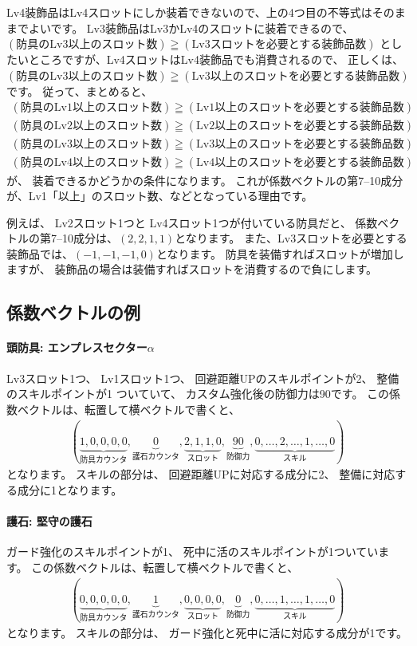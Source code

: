 \documentclass{jsarticle}
\begin{document}
Lv4装飾品はLv4スロットにしか装着できないので、上の4つ目の不等式はそのままでよいです。
Lv3装飾品はLv3かLv4のスロットに装着できるので、
$(\text{防具のLv3以上のスロット数}) \geqq (\text{Lv3スロットを必要とする装飾品数})$
としたいところですが、Lv4スロットはLv4装飾品でも消費されるので、
正しくは、
$(\text{防具のLv3以上のスロット数}) \geqq (\text{Lv3以上のスロットを必要とする装飾品数})$
です。
従って、まとめると、
\begin{align*}
(\text{防具のLv1以上のスロット数}) \geqq (\text{Lv1以上のスロットを必要とする装飾品数}) \\
(\text{防具のLv2以上のスロット数}) \geqq (\text{Lv2以上のスロットを必要とする装飾品数}) \\
(\text{防具のLv3以上のスロット数}) \geqq (\text{Lv3以上のスロットを必要とする装飾品数}) \\
(\text{防具のLv4以上のスロット数}) \geqq (\text{Lv4以上のスロットを必要とする装飾品数}) 
\end{align*}
が、
装着できるかどうかの条件になります。
%
これが係数ベクトルの第7--10成分が、Lv1「以上」のスロット数、などとなっている理由です。

例えば、
Lv2スロット1つと
Lv4スロット1つが付いている防具だと、
係数ベクトルの第7--10成分は、$(2,2,1,1)$となります。
%
また、Lv3スロットを必要とする装飾品では、$(-1,-1,-1,0)$となります。
防具を装備すればスロットが増加しますが、
装飾品の場合は装備すればスロットを消費するので負にします。

\subsection{係数ベクトルの例}
\paragraph{頭防具: エンプレスセクター$\alpha$}
Lv3スロット1つ、
Lv1スロット1つ、
回避距離UPのスキルポイントが2、
整備のスキルポイントが1
ついていて、
カスタム強化後の防御力は90です。
%
この係数ベクトルは、転置して横ベクトルで書くと、
\begin{align*}
(
\underbrace{1,0,0,0,0}_{\text{防具カウンタ}},
\underbrace{0}_{\text{護石カウンタ}},
\underbrace{2,1,1,0}_{\text{スロット}},
\underbrace{90}_{\text{防御力}},
\underbrace{0,\ldots, 2, \ldots, 1, \ldots ,0}_{\text{スキル}}
)
\end{align*}
となります。
スキルの部分は、
回避距離UPに対応する成分に2、
整備に対応する成分に1となります。

\paragraph{護石: 堅守の護石}
ガード強化のスキルポイントが1、
死中に活のスキルポイントが1ついています。
%
この係数ベクトルは、転置して横ベクトルで書くと、
\begin{align*}
(
\underbrace{0,0,0,0,0}_{\text{防具カウンタ}},
\underbrace{1}_{\text{護石カウンタ}},
\underbrace{0,0,0,0}_{\text{スロット}},
\underbrace{0}_{\text{防御力}},
\underbrace{0,\ldots, 1, \ldots, 1, \ldots ,0}_{\text{スキル}}
)
\end{align*}
となります。
スキルの部分は、
ガード強化と死中に活に対応する成分が1です。
\end{document}
